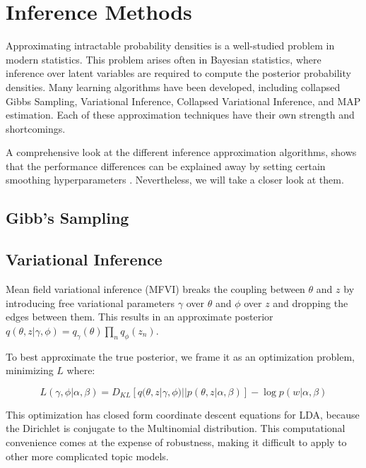 \documentclass[letterpaper]{article}
\begin{document}
\section{Inference Methods}
\label{sec:inference}
Approximating intractable probability densities is a well-studied
problem in modern statistics. This problem arises often in Bayesian
statistics, where inference over latent variables are required to
compute the posterior probability densities. Many learning algorithms
have been developed, including collapsed Gibbs Sampling, Variational
Inference, Collapsed Variational Inference, and MAP estimation. Each
of these approximation techniques have their own strength and
shortcomings.

A comprehensive look at the different inference approximation
algorithms, shows that the performance differences can be explained
away by setting certain smoothing hyperparameters
\citep{asuncion-2012-smoot-infer}. Nevertheless, we will take a closer
look at them.

\subsection{Gibb's Sampling}
\label{subsec:gibbs-sampling}

\subsection{Variational Inference}
\label{subsec:vi}
Mean field variational inference (MFVI) breaks the coupling between
$\theta$ and $z$ by introducing free variational parameters $\gamma$
over $\theta$ and $\phi$ over $z$ and dropping the edges between them.
This results in an approximate posterior $q(\theta, z | \gamma, \phi)
= q_\gamma(\theta)\prod_nq_\phi(z_n)$.

To best approximate the true posterior, we frame it as an optimization
problem, minimizing $L$ where:

\begin{equation}
L(\gamma, \phi | \alpha, \beta) = D_{KL}\left[ q(\theta, z | \gamma,
  \phi) || p(\theta, z | \alpha, \beta) \right] - \log p(w | \alpha, \beta)
\end{equation}

This optimization has closed form coordinate descent equations for
LDA, because the Dirichlet is conjugate to the Multinomial
distribution. This computational convenience comes at the expense of
robustness, making it difficult to apply to other more complicated
topic models.
\end{document}
